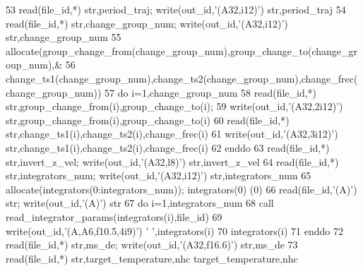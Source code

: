 \begin{DoxyCode}
53 \textcolor{keyword}{read}(file\_id,*) str,period\_traj;                        \textcolor{keyword}{write}(out\_id,\textcolor{stringliteral}{'(A32,i12)'}) str,period\_traj
54 \textcolor{keyword}{read}(file\_id,*) str,change\_group\_num;                   \textcolor{keyword}{write}(out\_id,\textcolor{stringliteral}{'(A32,i12)'}) str,change\_group\_num
55 \textcolor{keyword}{allocate}(group\_change\_from(change\_group\_num),group\_change\_to(change\_group\_num),&
56 change\_ts1(change\_group\_num),change\_ts2(change\_group\_num),change\_frec(change\_group\_num))
57 \textcolor{keywordflow}{do} i=1,change\_group\_num
58     \textcolor{keyword}{read}(file\_id,*) str,group\_change\_from(i),group\_change\_to(i);
59     \textcolor{keyword}{write}(out\_id,\textcolor{stringliteral}{'(A32,2i12)'}) str,group\_change\_from(i),group\_change\_to(i)
60     \textcolor{keyword}{read}(file\_id,*) str,change\_ts1(i),change\_ts2(i),change\_frec(i)
61     \textcolor{keyword}{write}(out\_id,\textcolor{stringliteral}{'(A32,3i12)'}) str,change\_ts1(i),change\_ts2(i),change\_frec(i)
62 \textcolor{keywordflow}{enddo}
63 \textcolor{keyword}{read}(file\_id,*) str,invert\_z\_vel;                       \textcolor{keyword}{write}(out\_id,\textcolor{stringliteral}{'(A32,l8)'}) str,invert\_z\_vel
64 \textcolor{keyword}{read}(file\_id,*) str,integrators\_num;                    \textcolor{keyword}{write}(out\_id,\textcolor{stringliteral}{'(A32,i12)'}) str,integrators\_num
65 \textcolor{keyword}{allocate}(integrators(0:integrators\_num)); integrators(0)%
      (0)%
66 \textcolor{keyword}{read}(file\_id,\textcolor{stringliteral}{'(A)'}) str;                                \textcolor{keyword}{write}(out\_id,\textcolor{stringliteral}{'(A)'}) str
67 \textcolor{keywordflow}{do} i=1,integrators\_num
68     \textcolor{keyword}{call }read\_integrator\_params(integrators(i),file\_id)
69     \textcolor{keyword}{write}(out\_id,\textcolor{stringliteral}{'(A,A6,f10.5,4i9)'}) \textcolor{stringliteral}{'  '},integrators(i)%
70     integrators(i)%
71 \textcolor{keywordflow}{enddo}
72 \textcolor{keyword}{read}(file\_id,*) str,ms\_de;                              \textcolor{keyword}{write}(out\_id,\textcolor{stringliteral}{'(A32,f16.6)'}) str,ms\_de
73 \textcolor{keyword}{read}(file\_id,*) str,target\_temperature,nhc%
      target\_temperature,nhc%

\end{DoxyCode}

